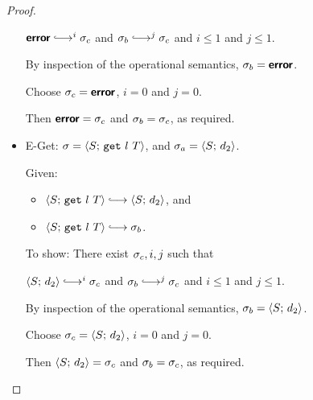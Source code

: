 \begin{proof}
\begin{itemize}
      $\error \parstepsto^i \conf_c$ and $\conf_b \parstepsto^j
      \conf_c$ and $i \leq 1$ and $j \leq 1$.

      By inspection of the operational semantics, $\sigma_b = \textbf{\textsf{error}}$.

      Choose $\sigma_c = \textbf{\textsf{error}}$, $i = 0$ and $j = 0$.

      Then $\textbf{\textsf{error}} = \sigma_c$ and $\sigma_b = \sigma_c$, as required.

    \item {\sc E-Get}: $\sigma = \langle S;\, \mbox{\texttt{get}}~l~T \rangle$, and
      $\sigma_a = \langle S;\, d_2 \rangle$.

      Given:
      \begin{itemize}
      \item $\config{S}{\getexp{l}{T}} \parstepsto \config{S}{d_2}$,
        and
      \item $\config{S}{\getexp{l}{T}} \parstepsto \conf_b$.
      \end{itemize}

      To show: There exist $\sigma_c, i, j$ such that

      $\config{S}{d_2} \parstepsto^i \conf_c$ and $\conf_b
      \parstepsto^j \conf_c$ and $i \leq 1$ and $j \leq 1$.

      By inspection of the operational semantics, $\sigma_b =
      \langle S;\, d_2 \rangle$.

      Choose $\sigma_c = \langle S;\, d_2 \rangle$, $i = 0$ and $j = 0$.

      Then $\langle S;\, d_2 \rangle = \sigma_c$ and $\sigma_b = \sigma_c$, as
      required.
  \end{itemize}
\end{proof}
